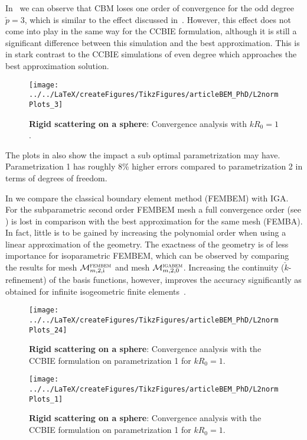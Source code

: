 In~ we can observe that CBM loses one order of convergence for the odd degree $\check{p}=3$, which is similar to the effect discussed in~\cite{Gomez2016tvc}. However, this effect does not come into play in the same way for the CCBIE formulation, although it is still a significant difference between this simulation and the best approximation. This is in stark contrast to the CCBIE simulations of even degree which approaches the best approximation solution.
\begin{figure}
	\centering
	\texttt{[image: ../../LaTeX/createFigures/TikzFigures/articleBEM\_PhD/L2normPlots\_3]}
	\caption{\textbf{Rigid scattering on a sphere}: Convergence analysis with $kR_0=1$.}
	\label{Fig3:S1_cgComp}
\end{figure}

The plots in  also show the impact a sub optimal parametrization may have. Parametrization 1 has roughly 8\% higher errors compared to parametrization 2 in terms of degrees of freedom.

In  we compare the classical boundary element method (FEMBEM) with IGA. For the subparametric second order FEMBEM mesh a full convergence order (see ) is lost in comparison with the best approximation for the same mesh (FEMBA). In fact, little is to be gained by increasing the polynomial order when using a linear approximation of the geometry. The exactness of the geometry is of less importance for isoparametric FEMBEM, which can be observed by comparing the results for mesh ${\cal M}_{m,2,\mathrm{i}}^{\textsc{fembem}}$ and mesh ${\cal M}_{m,2,0}^{\textsc{igabem}}$. Increasing the continuity ($\check{k}$-refinement) of the basis functions, however, improves the accuracy significantly as obtained for infinite isogeometric finite elements~\cite{Venas2018iao}.
\begin{figure}
	\centering
	\texttt{[image: ../../LaTeX/createFigures/TikzFigures/articleBEM\_PhD/L2normPlots\_24]}
	\caption{\textbf{Rigid scattering on a sphere}: Convergence analysis with the CCBIE formulation on parametrization 1 for $kR_0=1$.}
	\label{Fig3:convergenceAnalysis}
\end{figure}
\begin{figure}
	\centering
	\texttt{[image: ../../LaTeX/createFigures/TikzFigures/articleBEM\_PhD/L2normPlots\_1]}
	\caption{\textbf{Rigid scattering on a sphere}: Convergence analysis with the CCBIE formulation on parametrization 1 for $kR_0=1$.}
	\label{Fig3:convergenceAnalysis_nepw}
\end{figure}


